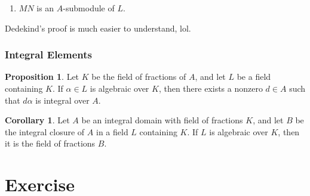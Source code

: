 \documentclass[a4paper]{book}
\theoremstyle{definition}
\newtheorem{corollary}{Corollary}
\newtheorem{proposition}[definition]{Proposition}
\begin{document}
\begin{enumerate}
    \item \(MN\) is an \(A\)-submodule of \(L\).
\end{enumerate}

Dedekind's proof is much easier to understand, lol.

\section*{Integral Elements}

\begin{proposition}
    Let \(K\) be the field of fractions of \(A\), and let \(L\) be a field containing \(K\). If \(\alpha \in L\) is algebraic over \(K\), then there exists a nonzero \(d \in A\) such that \(d \alpha \) is integral over \(A\).
\end{proposition}

\begin{corollary}
    Let \(A\) be an integral domain with field of fractions \(K\), and let \(B\) be the integral closure of \(A\) in a field \(L\) containing \(K\). If \(L\) is algebraic over \(K\), then it is the field of fractions \(B\).
\end{corollary}

\part{Exercise}
\end{document}
